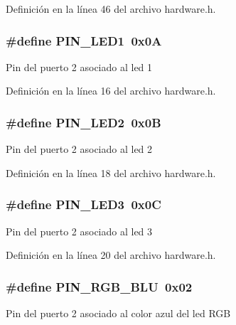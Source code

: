 Definición en la línea 46 del archivo hardware.\+h.

\subsubsection[{\texorpdfstring{P\+I\+N\+\_\+\+L\+E\+D1}{PIN_LED1}}]{\setlength{\rightskip}{0pt plus 5cm}\#define P\+I\+N\+\_\+\+L\+E\+D1~0x0A}\hypertarget{group__hardware_ga1ee291f6ef730418abd5997176fe6b4c}{}\label{group__hardware_ga1ee291f6ef730418abd5997176fe6b4c}
Pin del puerto 2 asociado al led 1 

Definición en la línea 16 del archivo hardware.\+h.

\subsubsection[{\texorpdfstring{P\+I\+N\+\_\+\+L\+E\+D2}{PIN_LED2}}]{\setlength{\rightskip}{0pt plus 5cm}\#define P\+I\+N\+\_\+\+L\+E\+D2~0x0B}\hypertarget{group__hardware_gaa10e44027a1a9f0ac7cba19e815205a8}{}\label{group__hardware_gaa10e44027a1a9f0ac7cba19e815205a8}
Pin del puerto 2 asociado al led 2 

Definición en la línea 18 del archivo hardware.\+h.

\subsubsection[{\texorpdfstring{P\+I\+N\+\_\+\+L\+E\+D3}{PIN_LED3}}]{\setlength{\rightskip}{0pt plus 5cm}\#define P\+I\+N\+\_\+\+L\+E\+D3~0x0C}\hypertarget{group__hardware_ga95a9a1b175a118c828537db81141eb3d}{}\label{group__hardware_ga95a9a1b175a118c828537db81141eb3d}
Pin del puerto 2 asociado al led 3 

Definición en la línea 20 del archivo hardware.\+h.

\subsubsection[{\texorpdfstring{P\+I\+N\+\_\+\+R\+G\+B\+\_\+\+B\+LU}{PIN_RGB_BLU}}]{\setlength{\rightskip}{0pt plus 5cm}\#define P\+I\+N\+\_\+\+R\+G\+B\+\_\+\+B\+LU~0x02}\hypertarget{group__hardware_gadf8d2d730566aede36c12ccfbc03b1b7}{}\label{group__hardware_gadf8d2d730566aede36c12ccfbc03b1b7}
Pin del puerto 2 asociado al color azul del led R\+GB 

